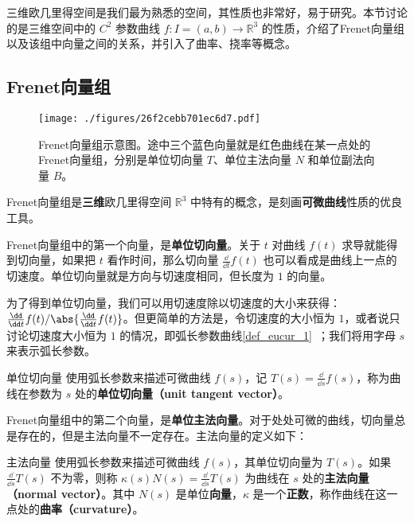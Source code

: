 

三维欧几里得空间是我们最为熟悉的空间，其性质也非常好，易于研究。本节讨论的是三维空间中的 $C^2$ 参数曲线 $f: I = (a, b) \to \mathbb{R}^3$ 的性质，介绍了Frenet向量组以及该组中向量之间的关系，并引入了曲率、挠率等概念。

\subsection{Frenet向量组}

\begin{figure}[ht]
\centering
\texttt{[image: ./figures/26f2cebb701ec6d7.pdf]}
\caption{Frenet向量组示意图。途中三个蓝色向量就是红色曲线在某一点处的Frenet向量组，分别是单位切向量 $T$、单位主法向量 $N$ 和单位副法向量 $B$。} \label{fig_Curv3D_1}
\end{figure}

Frenet向量组是\textbf{三维}欧几里得空间 $\mathbb{R}^3$ 中特有的概念，是刻画\textbf{可微曲线}性质的优良工具。

Frenet向量组中的第一个向量，是\textbf{单位切向量}。关于 $t$ 对曲线 $f(t)$ 求导就能得到切向量，如果把 $t$ 看作时间，那么切向量 $\frac{\dd}{\dd t}f(t)$ 也可以看成是曲线上一点的切速度。单位切向量就是方向与切速度相同，但长度为 $1$ 的向量。

为了得到单位切向量，我们可以用切速度除以切速度的大小来获得：$\frac{\dd}{\dd t}f(t)/\abs{\frac{\dd}{\dd t}f(t)}$。但更简单的方法是，令切速度的大小恒为 $1$，或者说只讨论切速度大小恒为 $1$ 的情况，即弧长参数曲线\autoref{def_eucur_1}~；我们将用字母 $s$来表示弧长参数。

\begin{definition}{单位切向量}\label{def_Curv3D_1}
使用弧长参数来描述可微曲线 $f(s)$，记 $T(s)=\frac{\dd}{\dd s}f(s)$，称为曲线在参数为 $s$ 处的\textbf{单位切向量（unit tangent vector）}。
\end{definition}

Frenet向量组中的第二个向量，是\textbf{单位主法向量}。对于处处可微的曲线，切向量总是存在的，但是主法向量不一定存在。主法向量的定义如下：

\begin{definition}{主法向量}\label{def_Curv3D_2}
使用弧长参数来描述可微曲线 $f(s)$，其单位切向量为 $T(s)$。如果 $\frac{\dd}{\dd s}T(s)$ 不为零，则称 $\kappa(s) N(s)=\frac{\dd}{\dd s}T(s)$ 为曲线在 $s$ 处的\textbf{主法向量（normal vector）}。其中 $N(s)$ 是单位\textbf{向量}，$\kappa$ 是一个\textbf{正数}，称作曲线在这一点处的\textbf{曲率（curvature）}。
\end{definition}

